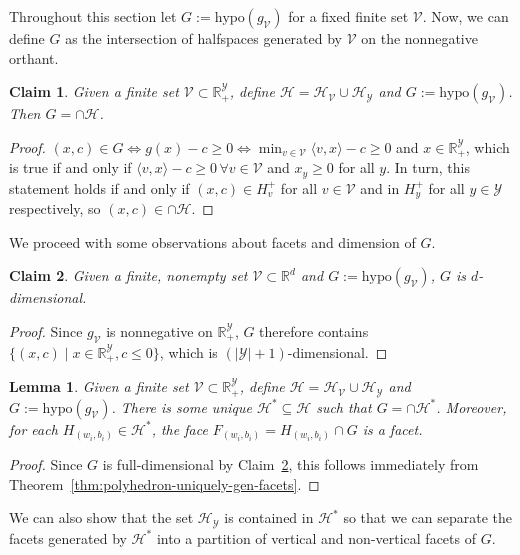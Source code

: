 \documentclass[11pt]{article}
\newcommand{\Comments}{1}
\newcommand{\mynote}[2]{\ifnum\Comments=1\textcolor{#1}{#2}\fi}
\newcommand{\raf}[1]{\mynote{darkgreen}{[RF: #1]}}
\newcommand{\reals}{\mathbb{R}}
\renewcommand{\H}{\mathcal{H}}
\newcommand{\V}{\mathcal{V}}
\newcommand{\Y}{\mathcal{Y}}
\newcommand{\inprod}[2]{\langle #1, #2 \rangle}%
\newcommand{\hyp}{\mathrm{hypo}}
\newtheorem{lemma}{Lemma}
\newtheorem{claim}{Claim}
\begin{document}
Throughout this section let $G:= \hyp(g_\V)$ for a fixed finite set $\V$.
Now, we can define $G$ as the intersection of halfspaces generated by $\V$ on the nonnegative orthant.
\begin{claim}\label{claim:G-intersection-H}
  Given a finite set $\V \subset \reals^\Y_+$, define $\H = \H_\V \cup \H_\Y$ and $G := \hyp(g_\V)$.
  Then $G = \cap \H$.
\end{claim}
\begin{proof}
  $(x,c) \in G \iff g(x) - c \geq 0 \iff \min_{v \in \V}\inprod{v}{x} - c \geq 0$ and $x \in \reals_+^\Y$, which is true if and only if $\inprod{v}{x} - c \geq 0 \,\forall v \in \V$ and $x_y \geq 0$ for all $y$.
  In turn, this statement holds if and only if $(x,c) \in H^+_v$ for all $v \in \V$ and in $H^+_y$ for all $y \in \Y$ respectively, so $(x,c) \in \cap \H$.
\end{proof}

We proceed with some observations about facets and dimension of $G$.

\begin{claim}\label{claim:G-full-dimensional}
  Given a finite, nonempty set $\V \subset \reals^d$ and $G := \hyp(g_\V)$, $G$ is $d$-dimensional.  %
\end{claim}
\begin{proof}
  Since $g_\V$ is nonnegative on $\reals_+^\Y$, $G$ therefore contains $\{(x,c) \mid x\in\reals^\Y_+, c \leq 0\}$, which is $(|\Y| + 1)$-dimensional.
\end{proof}


\begin{lemma}\label{lem:G-unique-facets-Hstar}
  Given a finite set $\V \subset \reals^\Y_+$, define $\H = \H_\V \cup \H_\Y$ and $G := \hyp(g_\V)$.
  There is some unique $\H^* \subseteq \H$ such that $G = \cap \H^*$. 
  Moreover, for each $H_{(w_i, b_i)} \in\H^*$, the face $F_{(w_i, b_i)} = H_{(w_i, b_i)} \cap G$ is a facet.
\end{lemma}
\begin{proof}
  Since $G$ is full-dimensional by Claim~\ref{claim:G-full-dimensional}, this follows immediately from Theorem~\ref{thm:polyhedron-uniquely-gen-facets}.
\end{proof}
We can also show that the set $\H_\Y$ is contained in $\H^*$ so that we can separate the facets generated by $\H^*$ into a partition of vertical and non-vertical facets of $G$.
\end{document}

